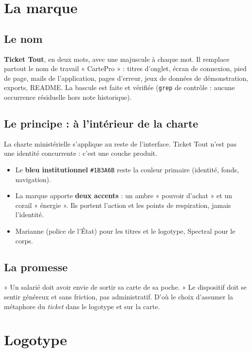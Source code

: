 \documentclass[11pt,a4paper]{article}
\newcommand{\hex}[1]{\texttt{\small #1}}
\newcommand{\code}[1]{\texttt{\small #1}}
\begin{document}
\section{La marque}

\subsection{Le nom}
\textbf{Ticket Tout}, en deux mots, avec une majuscule à chaque mot. Il remplace
partout le nom de travail « CartePro » : titres d'onglet, écran de connexion,
pied de page, mails de l'application, pages d'erreur, jeux de données de
démonstration, exports, README. La bascule est faite et vérifiée
(\code{grep} de contrôle : aucune occurrence résiduelle hors note historique).

\subsection{Le principe : à l'intérieur de la charte}
La charte ministérielle s'applique au reste de l'interface. Ticket Tout n'est
pas une identité concurrente : c'est une couche produit.
\begin{itemize}
  \item Le \textbf{bleu institutionnel} \hex{\#1B3A6B} reste la couleur primaire
        (identité, fonds, navigation).
  \item La marque apporte \textbf{deux accents} : un ambre « pouvoir d'achat »
        et un corail « énergie ». Ils portent l'action et les points de
        respiration, jamais l'identité.
  \item Marianne (police de l'État) pour les titres et le logotype, Spectral
        pour le corps.
\end{itemize}

\subsection{La promesse}
« Un salarié doit avoir envie de sortir sa carte de sa poche. » Le dispositif
doit se sentir généreux et sans friction, pas administratif. D'où le choix
d'assumer la métaphore du \emph{ticket} dans le logotype et sur la carte.
\newpage

\section{Logotype}
\end{document}
